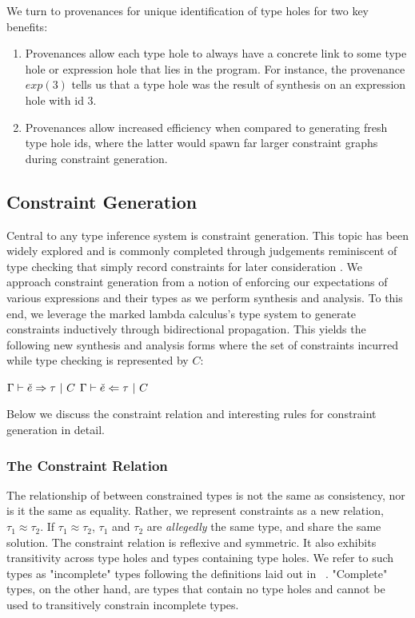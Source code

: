 We turn to provenances for unique identification of type holes for two key benefits:
\begin{enumerate}
    \item Provenances allow each type hole to always have a concrete link to some type hole or expression hole that lies in the program. For instance, the provenance $exp(3)$ tells us that a type hole was the result of synthesis on an expression hole with id 3.
    \item Provenances allow increased efficiency when compared to generating fresh type hole ids, where the latter would spawn far larger constraint graphs during constraint generation.
\end{enumerate}

\subsection{Constraint Generation}
Central to any type inference system is constraint generation. This topic has been widely explored and is commonly completed through judgements reminiscent of type checking that simply record constraints for later consideration \cite{TAPL}. We approach constraint generation from a notion of enforcing our expectations of various expressions and their types as we perform synthesis and analysis. To this end, we leverage the marked lambda calculus's type system to generate constraints inductively through bidirectional propagation. This yields the following new synthesis and analysis forms where the set of constraints incurred while type checking is represented by $C$:
\begin{center}
    $\Gamma \vdash \check{e} \Rightarrow \tau ~|~ C$ \hspace{3cm} $\Gamma \vdash \check{e} \Leftarrow \tau ~|~ C$
\end{center}
Below we discuss the constraint relation and interesting rules for constraint generation in detail.

\subsubsection{The Constraint Relation}
The relationship of between constrained types is not the same as consistency, nor is it the same as equality. Rather, we represent constraints as a new relation, $\tau_1 \approx \tau_2$. If $\tau_1 \approx \tau_2$, $\tau_1$ and $\tau_2$ are \textit{allegedly} the same type, and share the same solution. The constraint relation is reflexive and symmetric. It also exhibits transitivity across type holes and types containing type holes. We refer to such types as "incomplete" types following the definitions laid out in ~\cite{HazelnutPOPL}. "Complete" types, on the other hand, are types that contain no type holes and cannot be used to transitively constrain incomplete types.

